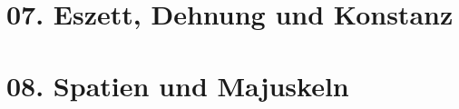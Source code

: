 \documentclass[handout,aspectratio=1610,dvipsnames]{beamer}
\begin{document}
  \section{07. Eszett, Dehnung und Konstanz}
  \let\woopsi\section\let\section\subsection\let\subsection\subsubsection
  
  \let\subsection\section\let\section\woopsi
  
  \section{08. Spatien und Majuskeln}
  \let\woopsi\section\let\section\subsection\let\subsection\subsubsection
  
  \let\subsection\section\let\section\woopsi
  
\end{document}
